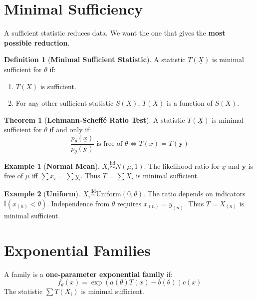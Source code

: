 \documentclass[12pt, a4paper]{article}
\theoremstyle{definition}
\newtheorem{definition}{Definition}
\newtheorem{example}{Example}
\newtheorem{theorem}{Theorem}
\newcommand{\iid}{\overset{\text{iid}}{\sim}}
\newcommand{\xvec}{\underline{x}}
\newcommand{\Xvec}{\underline{X}}
\begin{document}
\section{Minimal Sufficiency}
A sufficient statistic reduces data. We want the one that gives the \textbf{most possible reduction}.

\begin{definition}[\textbf{Minimal Sufficient Statistic}]
A statistic $T(\Xvec)$ is minimal sufficient for $\theta$ if:
\begin{enumerate}
    \item $T(\Xvec)$ is sufficient.
    \item For any other sufficient statistic $S(\Xvec)$, $T(\Xvec)$ is a function of $S(\Xvec)$.
\end{enumerate}
\end{definition}

\begin{theorem}[\textbf{Lehmann-Scheff\'e Ratio Test}]
A statistic $T(\Xvec)$ is minimal sufficient for $\theta$ if and only if:
$$ \frac{p_\theta(\xvec)}{p_\theta(\mathbf{y})} \text{ is free of } \theta \iff T(\xvec) = T(\mathbf{y}) $$
\end{theorem}

\begin{example}[\textbf{Normal Mean}]
$X_i \iid N(\mu, 1)$. The likelihood ratio for $\xvec$ and $\mathbf{y}$ is free of $\mu$ iff $\sum x_i = \sum y_i$. Thus $T = \sum X_i$ is minimal sufficient.
\end{example}

\begin{example}[\textbf{Uniform}]
$X_i \iid \text{Uniform}(0, \theta)$. The ratio depends on indicators $\mathbb{I}(x_{(n)} < \theta)$. Independence from $\theta$ requires $x_{(n)} = y_{(n)}$. Thus $T = X_{(n)}$ is minimal sufficient.
\end{example}

\section{Exponential Families}
A family is a \textbf{one-parameter exponential family} if:
$$ f_\theta(x) = \exp(a(\theta)T(x) - b(\theta))c(x) $$
The statistic $\sum T(X_i)$ is minimal sufficient.
\end{document}
